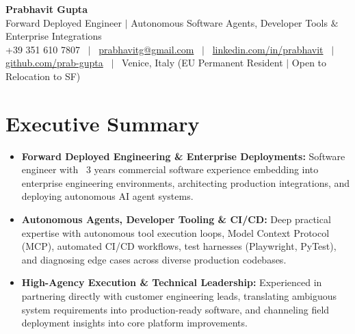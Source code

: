 \documentclass[a4paper,10pt]{article}
\begin{document}
\begin{minipage}[c]{0.80\textwidth}
  {\Huge\bfseries Prabhavit Gupta}\\[3pt]
  {\color{accent}\large Forward Deployed Engineer $\vert$ Autonomous Software Agents, Developer Tools $\&$ Enterprise Integrations}\\[6pt]
  {\footnotesize +39 351 610 7807 ~$\vert$~
  \href{mailto:prabhavitg@gmail.com}{prabhavitg@gmail.com} ~$\vert$~
  \href{https://www.linkedin.com/in/prabhavit/}{linkedin.com/in/prabhavit} ~$\vert$~
  \href{https://github.com/prab-gupta}{github.com/prab-gupta} ~$\vert$~
  Venice, Italy (EU Permanent Resident $\vert$ Open to Relocation to SF)}
\end{minipage}\hfill

\vspace{6pt}

\section{Executive Summary}
\begin{itemize}
  \item \textbf{Forward Deployed Engineering \& Enterprise Deployments:} Software engineer with ~3 years commercial software experience embedding into enterprise engineering environments, architecting production integrations, and deploying autonomous AI agent systems.
  \item \textbf{Autonomous Agents, Developer Tooling \& CI/CD:} Deep practical expertise with autonomous tool execution loops, Model Context Protocol (MCP), automated CI/CD workflows, test harnesses (Playwright, PyTest), and diagnosing edge cases across diverse production codebases.
  \item \textbf{High-Agency Execution \& Technical Leadership:} Experienced in partnering directly with customer engineering leads, translating ambiguous system requirements into production-ready software, and channeling field deployment insights into core platform improvements.
\end{itemize}

\end{document}
